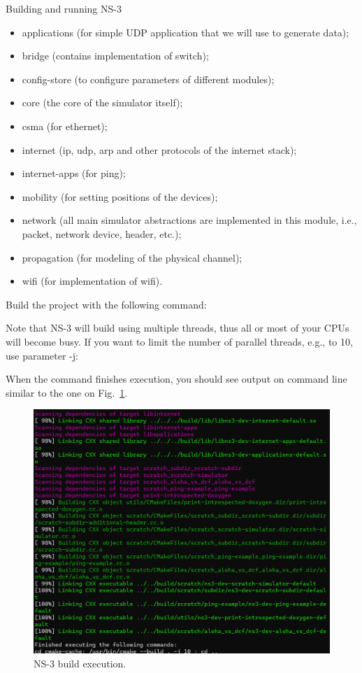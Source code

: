 \begin{exercise}{Building and running NS-3}
\begin{enumerate}
	\begin{itemize}
		\item applications (for simple UDP application that we will use to generate data);
		\item bridge (contains implementation of switch);
		\item config-store (to configure parameters of different modules);
		\item core (the core of the simulator itself);
		\item csma (for ethernet);
		\item internet (\ac{ip}, \ac{udp}, \ac{arp} and other protocols of the internet stack);
		\item internet-apps (for ping);
		\item mobility (for setting positions of the devices);
		\item network (all main simulator abstractions are implemented in this module, i.e., packet, network device, header, etc.);
		\item propagation (for modeling of the physical channel);
		\item wifi (for implementation of wifi).
	\end{itemize}
	
	Build the project with the following command:
	\begin{cmdblock}[gobble=2]
	\end{cmdblock}
	Note that NS-3 will build using multiple threads, thus all or most of your CPUs will become busy. If you want to limit the number of parallel threads, e.g., to 10, use parameter -j:
	\begin{cmdblock}[gobble=2]
	\end{cmdblock}
	When the command finishes execution, you should see output on command line similar to the one on Fig.~\ref{fig:lab7-ns3-build}.
	\begin{figure}[ht]
		\centering
		\includegraphics[width=0.8\linewidth]{graphics/ns3-build}	
		\caption{NS-3 build execution.}
		\label{fig:lab7-ns3-build}
	\end{figure}
		

\end{enumerate}
\end{exercise}
